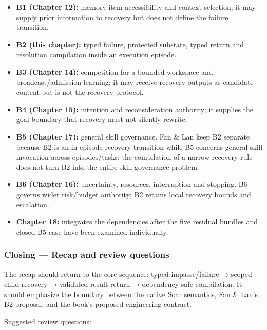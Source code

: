 \begin{itemize}
\tightlist
\item
  \textbf{B1 (Chapter 12):} memory-item accessibility and context selection; it may supply prior information to recovery but does not define the failure transition.
\item
  \textbf{B2 (this chapter):} typed failure, protected substate, typed return and resolution compilation inside an execution episode.
\item
  \textbf{B3 (Chapter 14):} competition for a bounded workspace and broadcast/admission learning; it may receive recovery outputs as candidate content but is not the recovery protocol.
\item
  \textbf{B4 (Chapter 15):} intention and reconsideration authority; it supplies the goal boundary that recovery must not silently rewrite.
\item
  \textbf{B5 (Chapter 17):} general skill governance. Fan \& Lan keep B2 separate because B2 is an in-episode recovery transition while B5 concerns general skill invocation across episodes/tasks; the compilation of a narrow recovery rule does not turn B2 into the entire skill-governance problem.
\item
  \textbf{B6 (Chapter 16):} uncertainty, resources, interruption and stopping. B6 governs wider risk/budget authority; B2 retains local recovery bounds and escalation.
\item
  \textbf{Chapter 18:} integrates the dependencies after the five residual bundles and closed B5 case have been examined individually.
\end{itemize}

\subsubsection{Closing --- Recap and review questions}\label{closing-recap-and-review-questions}

The recap should return to the core sequence: typed impasse/failure → scoped child recovery → validated result return → dependency-safe compilation. It should emphasize the boundary between the native Soar semantics, Fan \& Lan's B2 proposal, and the book's proposed engineering contract.

Suggested review questions:

